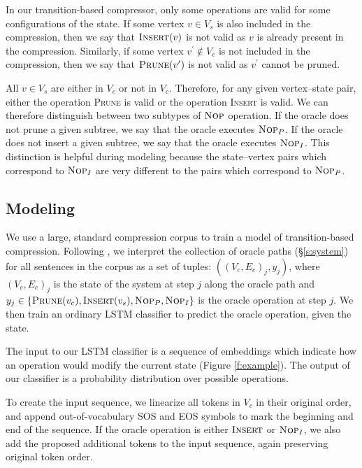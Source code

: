 \documentclass[11pt,a4paper]{article}
\begin{document}
In our transition-based compressor, only some operations are valid for some configurations of the state. If some vertex $v \in V_s$ is also included in the compression, then we say that $\textsc{Insert}(v)$ is not valid as $v$ is already present in the compression. Similarly, if some vertex $v^{\prime} \notin V_c$ is not included in the compression, then we say that $\textsc{Prune}(v^{\prime})$ is not valid as $v^{\prime}$ cannot be pruned.

All $v \in V_s$ are either in $V_c$ or not in $V_c$. Therefore, for any given vertex--state pair, either the operation \textsc{Prune} is valid or the operation \textsc{Insert} is valid. We can therefore distinguish between two subtypes of $\textsc{Nop}$ operation. If the oracle does not prune a given subtree, we say that the oracle executes $\textsc{Nop}_P$. If the oracle does not insert a given subtree, we say that the oracle executes $\textsc{Nop}_I$. This distinction is helpful during modeling because the state--vertex pairs which correspond to $\textsc{Nop}_I$ are very different to the pairs which correspond to $\textsc{Nop}_P$.

\subsection{Modeling}\label{s:modeling}

We use a large, standard compression corpus \cite{filippova2013overcoming} to train a model of transition-based compression. Following \citet{D14-1082}, we interpret the collection of oracle paths (\S\ref{s:system}) for all sentences in the corpus as a set of tuples: ${((V_c,E_c)_j, y_j)}$, where $(V_c,E_c)_j$ is the state of the system at step $j$ along the oracle path and $y_j \in  \{ \textsc{Prune}(v_c), \textsc{Insert}(v_s), \textsc{Nop}_P, \textsc{Nop}_I \}$ is the oracle operation at step $j$. We then train an ordinary LSTM classifier to predict the oracle operation, given the state. 

The input to our LSTM classifier is a sequence of embeddings which indicate how an operation would modify the current state (Figure \ref{f:example}). The output of our classifier is a probability distribution over possible operations.

To create the input sequence, we linearize all tokens in $V_c$ in their original order, and append out-of-vocabulary SOS and EOS symbols to mark the beginning and end of the sequence. If the oracle operation is either $\textsc{Insert}$ or $\textsc{Nop}_I$, we also add the proposed additional tokens to the input sequence, again preserving original token order.
\end{document}
